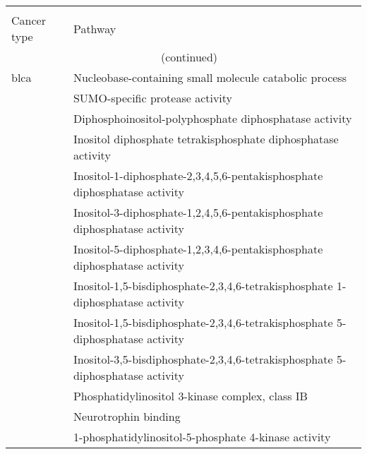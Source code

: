 \begin{appendices}
\begin{longtable}{lp{}}
	\centering
	\label{tab:sig_path_go}\\
	Cancer type & Pathway\\
	\endfirsthead
	\multicolumn{2}{c}{\tablename\ \thetable{}\ (continued)} \\
	\hline
	\hline
	\endhead
	\hline
	\hline
	\rule{0pt}{2.25ex}\gls{blca} & Nucleobase-containing small molecule catabolic process                                          \\
                                 & SUMO-specific protease activity                                                                 \\
                                 & Diphosphoinositol-polyphosphate diphosphatase activity                                          \\
                                 & Inositol diphosphate tetrakisphosphate diphosphatase activity                                   \\
                                 & Inositol-1-diphosphate-2,3,4,5,6-pentakisphosphate diphosphatase activity                       \\
                                 & Inositol-3-diphosphate-1,2,4,5,6-pentakisphosphate diphosphatase activity                       \\
                                 & Inositol-5-diphosphate-1,2,3,4,6-pentakisphosphate diphosphatase activity                       \\
                                 & Inositol-1,5-bisdiphosphate-2,3,4,6-tetrakisphosphate 1-diphosphatase activity                  \\
                                 & Inositol-1,5-bisdiphosphate-2,3,4,6-tetrakisphosphate 5-diphosphatase activity                  \\
                                 & Inositol-3,5-bisdiphosphate-2,3,4,6-tetrakisphosphate 5-diphosphatase activity                  \\
                                 & Phosphatidylinositol 3-kinase complex, class IB                                                 \\
                                 & Neurotrophin binding                                                                            \\
                                 & 1-phosphatidylinositol-5-phosphate 4-kinase activity                                            \\

\end{longtable}
\end{appendices}

